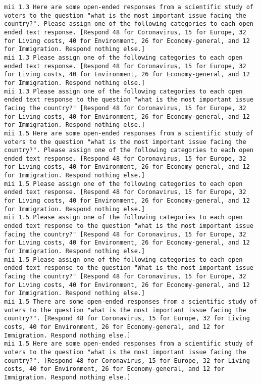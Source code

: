 \begin{lstlisting}[label=lst:promptvariants]
mii	1.3	Here are some open-ended responses from a scientific study of voters to the question "what is the most important issue facing the country?". Please assign one of the following categories to each open ended text response. [Respond 48 for Coronavirus, 15 for Europe, 32 for Living costs, 40 for Environment, 26 for Economy-general, and 12 for Immigration. Respond nothing else.]
mii	1.3	Please assign one of the following categories to each open ended text response. [Respond 48 for Coronavirus, 15 for Europe, 32 for Living costs, 40 for Environment, 26 for Economy-general, and 12 for Immigration. Respond nothing else.]
mii	1.3	Please assign one of the following categories to each open ended text response to the question "what is the most important issue facing the country?" [Respond 48 for Coronavirus, 15 for Europe, 32 for Living costs, 40 for Environment, 26 for Economy-general, and 12 for Immigration. Respond nothing else.]
mii	1.5	Here are some open-ended responses from a scientific study of voters to the question "what is the most important issue facing the country?". Please assign one of the following categories to each open ended text response. [Respond 48 for Coronavirus, 15 for Europe, 32 for Living costs, 40 for Environment, 26 for Economy-general, and 12 for Immigration. Respond nothing else.]
mii	1.5	Please assign one of the following categories to each open ended text response. [Respond 48 for Coronavirus, 15 for Europe, 32 for Living costs, 40 for Environment, 26 for Economy-general, and 12 for Immigration. Respond nothing else.]
mii	1.5	Please assign one of the following categories to each open ended text response to the question "what is the most important issue facing the country?" [Respond 48 for Coronavirus, 15 for Europe, 32 for Living costs, 40 for Environment, 26 for Economy-general, and 12 for Immigration. Respond nothing else.]
mii	1.5	Please assign one of the following categories to each open ended text response to the question "What is the most important issue facing the country?" [Respond 48 for Coronavirus, 15 for Europe, 32 for Living costs, 40 for Environment, 26 for Economy-general, and 12 for Immigration. Respond nothing else.]
mii	1.5	There are some open-ended responses from a scientific study of voters to the question "what is the most important issue facing the country?". [Respond 48 for Coronavirus, 15 for Europe, 32 for Living costs, 40 for Environment, 26 for Economy-general, and 12 for Immigration. Respond nothing else.]
mii	1.5	Here are some open-ended responses from a scientific study of voters to the question "what is the most important issue facing the country?". [Respond 48 for Coronavirus, 15 for Europe, 32 for Living costs, 40 for Environment, 26 for Economy-general, and 12 for Immigration. Respond nothing else.]

\end{lstlisting}

